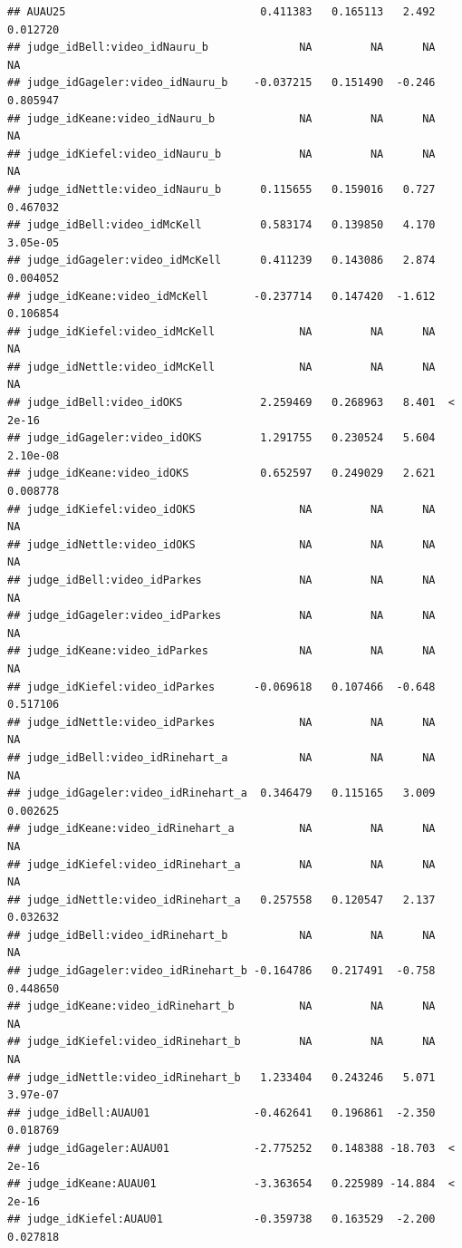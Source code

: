 \documentclass{monashthesis}
\begin{document}
\begin{verbatim}
## AUAU25                              0.411383   0.165113   2.492 0.012720
## judge_idBell:video_idNauru_b              NA         NA      NA       NA
## judge_idGageler:video_idNauru_b    -0.037215   0.151490  -0.246 0.805947
## judge_idKeane:video_idNauru_b             NA         NA      NA       NA
## judge_idKiefel:video_idNauru_b            NA         NA      NA       NA
## judge_idNettle:video_idNauru_b      0.115655   0.159016   0.727 0.467032
## judge_idBell:video_idMcKell         0.583174   0.139850   4.170 3.05e-05
## judge_idGageler:video_idMcKell      0.411239   0.143086   2.874 0.004052
## judge_idKeane:video_idMcKell       -0.237714   0.147420  -1.612 0.106854
## judge_idKiefel:video_idMcKell             NA         NA      NA       NA
## judge_idNettle:video_idMcKell             NA         NA      NA       NA
## judge_idBell:video_idOKS            2.259469   0.268963   8.401  < 2e-16
## judge_idGageler:video_idOKS         1.291755   0.230524   5.604 2.10e-08
## judge_idKeane:video_idOKS           0.652597   0.249029   2.621 0.008778
## judge_idKiefel:video_idOKS                NA         NA      NA       NA
## judge_idNettle:video_idOKS                NA         NA      NA       NA
## judge_idBell:video_idParkes               NA         NA      NA       NA
## judge_idGageler:video_idParkes            NA         NA      NA       NA
## judge_idKeane:video_idParkes              NA         NA      NA       NA
## judge_idKiefel:video_idParkes      -0.069618   0.107466  -0.648 0.517106
## judge_idNettle:video_idParkes             NA         NA      NA       NA
## judge_idBell:video_idRinehart_a           NA         NA      NA       NA
## judge_idGageler:video_idRinehart_a  0.346479   0.115165   3.009 0.002625
## judge_idKeane:video_idRinehart_a          NA         NA      NA       NA
## judge_idKiefel:video_idRinehart_a         NA         NA      NA       NA
## judge_idNettle:video_idRinehart_a   0.257558   0.120547   2.137 0.032632
## judge_idBell:video_idRinehart_b           NA         NA      NA       NA
## judge_idGageler:video_idRinehart_b -0.164786   0.217491  -0.758 0.448650
## judge_idKeane:video_idRinehart_b          NA         NA      NA       NA
## judge_idKiefel:video_idRinehart_b         NA         NA      NA       NA
## judge_idNettle:video_idRinehart_b   1.233404   0.243246   5.071 3.97e-07
## judge_idBell:AUAU01                -0.462641   0.196861  -2.350 0.018769
## judge_idGageler:AUAU01             -2.775252   0.148388 -18.703  < 2e-16
## judge_idKeane:AUAU01               -3.363654   0.225989 -14.884  < 2e-16
## judge_idKiefel:AUAU01              -0.359738   0.163529  -2.200 0.027818

\end{verbatim}
\end{document}
